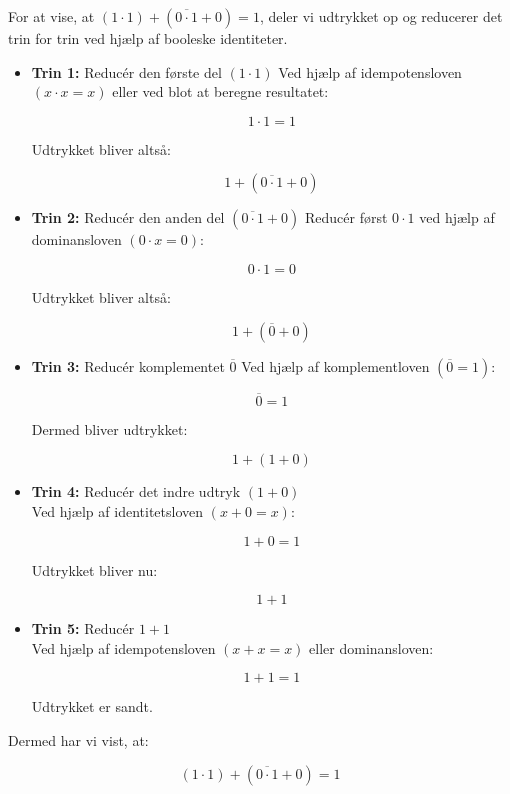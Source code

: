 \begin{solution}
    For at vise, at $(1 \cdot 1)+(\overline{0 \cdot 1}+0)=1$, deler vi udtrykket op og reducerer det trin for trin ved hjælp af booleske identiteter.

    \begin{itemize}
        \item \textbf{Trin 1:} Reducér den første del $(1 \cdot 1)$
                Ved hjælp af idempotensloven $(x \cdot x=x)$ eller ved blot at beregne resultatet:
                
                \[
                1 \cdot 1=1
                \]
                
                
                Udtrykket bliver altså:
                
                \[
                1+(\overline{0 \cdot 1}+0)
                \]
        \item \textbf{Trin 2:} Reducér den anden del $(\overline{0 \cdot 1}+0)$
                Reducér først $0 \cdot 1$ ved hjælp af dominansloven $(0 \cdot x=0)$:
                
                \[
                0 \cdot 1=0
                \]
                
                
                Udtrykket bliver altså:
                
                \[
                1+(\overline{0}+0)
                \]
        \item \textbf{Trin 3:} Reducér komplementet $\overline{0}$
    Ved hjælp af komplementloven $(\overline{0}=1)$:
    
    \[
    \overline{0}=1
    \]

    
    
    Dermed bliver udtrykket:
    
    \[
    1+(1+0)
    \]

    \item \textbf{Trin 4:} Reducér det indre udtryk \( (1 + 0) \) \\
        Ved hjælp af identitetsloven \( (x + 0 = x) \):
        
        \[
        1 + 0 = 1
        \]
        
        Udtrykket bliver nu:
        
        \[
        1 + 1
        \]
        
        \item \textbf{Trin 5: }Reducér \( 1 + 1 \) \\
        Ved hjælp af idempotensloven \( (x + x = x) \) eller dominansloven:
        
        \[
        1 + 1 = 1
        \]
        
        Udtrykket er sandt. \end{itemize}
        Dermed har vi vist, at:
        
        \[
        (1 \cdot 1) + (\overline{0 \cdot 1} + 0) = 1
        \]
        \end{solution}

